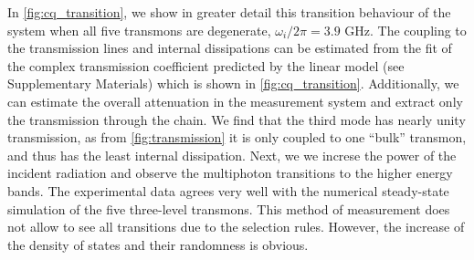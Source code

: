 \documentclass[%
 aps, prl,
 amsmath,amssymb,
 reprint,%
superscriptaddress
]{revtex4-2}
\begin{document}
In \autoref{fig:cq_transition}, we show in greater detail this transition behaviour of the system when all five transmons are degenerate, $\omega_i/2\pi = 3.9$ GHz. The coupling to the transmission lines and internal dissipations can be estimated from the fit of the complex transmission coefficient predicted by the linear model (see Supplementary Materials) which is shown in \autoref{fig:cq_transition}. Additionally, we can estimate the overall attenuation in the measurement system and extract only the transmission through the chain. We find that the third mode has nearly unity transmission, as from \autoref{fig:transmission} it is only coupled to one ``bulk'' transmon, and thus has the least internal dissipation. Next, we we increse the power of the incident radiation and observe the multiphoton transitions to the higher energy bands. The experimental data agrees very well with the numerical steady-state simulation of the five three-level transmons. This method of measurement does not allow to see all transitions due to the selection rules. However, the increase of the density of states and their randomness is obvious. 





\end{document}
